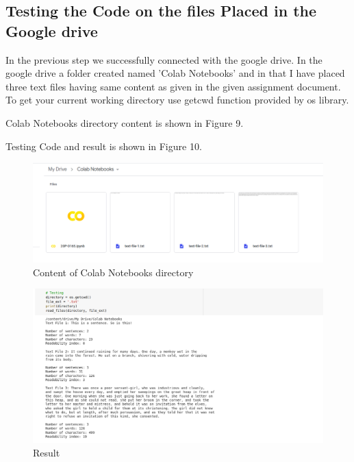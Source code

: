 \documentclass{article}
\begin{document}
\subsection{Testing the Code on the files Placed in the Google drive}
In the previous step we successfully connected with the google drive. In the google drive a folder created named 'Colab Notebooks' and in that I have placed three text files having same content as given in the given assignment document. To get your current working directory use getcwd function provided by os library. 

Colab Notebooks directory content is shown in Figure 9.

Testing Code and result is shown in Figure 10.




\begin{figure}
\centering
\includegraphics[scale=0.2]{screenshots/ai_a1-9.png}
\caption{\label{fig:python_code_read_files_produce_output}Content of Colab Notebooks directory}
\end{figure}


\begin{figure}
\centering
\includegraphics[scale=0.2]{screenshots/ai_a1-10.png}
\caption{\label{fig:python_code_read_files_produce_output}Result}
\end{figure}
\end{document}
